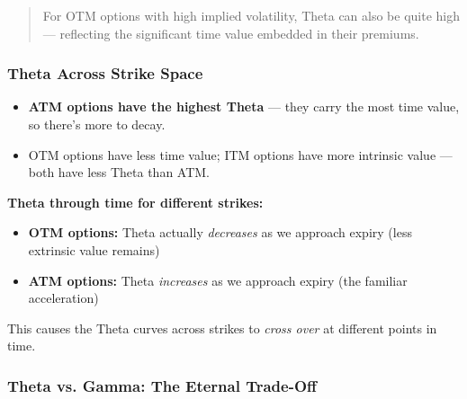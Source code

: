 \documentclass[12pt,openany]{book}
\begin{document}
\begin{quote}
For OTM options with high implied volatility, Theta can also be quite high — reflecting the significant time value embedded in their premiums.
\end{quote}

\subsubsection{Theta Across Strike Space}


\begin{center}
\end{center}


\begin{itemize}[leftmargin=*]
    \item \textbf{ATM options have the highest Theta} — they carry the most time value, so there's more to decay.
    \item OTM options have less time value; ITM options have more intrinsic value — both have less Theta than ATM.
\end{itemize}

\textbf{Theta through time for different strikes:}
\begin{itemize}[leftmargin=*]
    \item \textbf{OTM options:} Theta actually \emph{decreases} as we approach expiry (less extrinsic value remains)
    \item \textbf{ATM options:} Theta \emph{increases} as we approach expiry (the familiar acceleration)
\end{itemize}

This causes the Theta curves across strikes to \emph{cross over} at different points in time.

\subsubsection{Theta vs. Gamma: The Eternal Trade-Off}
\end{document}
